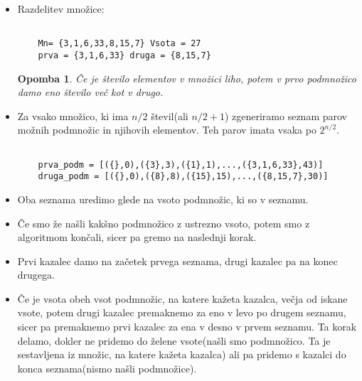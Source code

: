 \documentclass[12pt]{article}
\newtheorem{Opomba}[Izrek]{{\sc Opomba}}
\newenvironment{opomba}{\begin{Opomba}\rm}{\end{Opomba}}
\begin{document}
 \begin{itemize}
  \item Razdelitev množice:\newline
  \begin{lstlisting}

    Mn= {3,1,6,33,8,15,7} Vsota = 27
    prva = {3,1,6,33} druga = {8,15,7}
  \end{lstlisting}
  \begin{opomba}
    Če je število elementov v množici liho, potem v prvo podmnožico damo eno
    število več kot v drugo.
  \end{opomba}
  \item Za vsako množico, ki ima $n/2$ števil(ali $n/2 + 1$) 
        zgeneriramo seznam parov možnih podmnožic in njihovih elementov. Teh parov imata vsaka po $2^{n/2}$. 
  \begin{lstlisting}

    prva_podm = [({},0),({3},3),({1},1),...,({3,1,6,33},43)]
    druga_podm = [({},0),({8},8),({15},15),...,({8,15,7},30)]
  \end{lstlisting} 


  \item Oba seznama uredimo glede na vsoto podmnožic, ki so v seznamu.
  \item Če smo že našli kakšno podmnožico z ustrezno vsoto, potem smo z algoritmom končali,
  sicer pa gremo na naslednji korak.
  \item Prvi kazalec damo na začetek prvega seznama, drugi kazalec pa na konec drugega.
  \item Če je vsota obeh vsot podmnožic, na katere kažeta kazalca, večja od iskane vsote, potem 
  drugi kazalec premaknemo za eno v levo po drugem seznamu, sicer pa premaknemo prvi kazalec za ena v desno v prvem seznamu. \newline
  Ta korak delamo, dokler ne pridemo do želene vsote(našli smo podmnožico. Ta je sestavljena iz množic,
  na katere kažeta kazalca) ali pa pridemo s kazalci do konca seznama(nismo našli podmnožice). 
\end{itemize}
\end{document}

